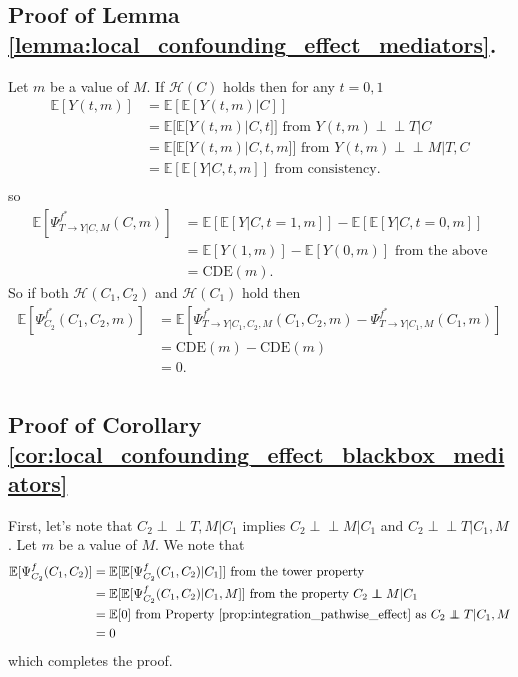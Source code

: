 \documentclass{article}
\theoremstyle{plain}
\theoremstyle{definition}
\theoremstyle{remark}
\newcommand{\effect}{\Psi}
\theoremstyle{mystyle}
\newcommand{\indep}{\perp\!\!\!\!\perp}
\begin{document}
\subsection{Proof of Lemma \ref{lemma:local_confounding_effect_mediators}.}
\label{proof:local_confounding_effect_mediators}
Let $m$ be a value of $M$. If $\mathcal{H}(C)$ holds then for any $t = 0, 1$
\begin{align*}
    \mathbb{E}[Y(t,m)]
    &= \mathbb{E}[\mathbb{E}[Y(t,m) | C]] \\
    &= \mathbb{E}[\mathbb{E}[Y(t,m) | C, t]] \text{ from } Y(t,m) \indep T | C \\
    &= \mathbb{E}[\mathbb{E}[Y(t,m) | C, t, m]] \text{ from } Y(t,m) \indep M | T, C \\
    &= \mathbb{E}[\mathbb{E}[Y | C, t, m]] \text{ from consistency.} \\
\end{align*}
so
\begin{align*}
    \mathbb{E}[\effect^{f^*}_{T \rightarrow Y | C, M}(C, m)]
    &= \mathbb{E}[\mathbb{E}[Y|C,t=1,m]] - \mathbb{E}[\mathbb{E}[Y|C,t=0,m]] \\
    &= \mathbb{E}[Y(1,m)] - \mathbb{E}[Y(0,m)] \text{ from the above} \\
    &= \text{CDE}(m).
\end{align*}
So if both $\mathcal{H}(C_1,C_2)$ and $\mathcal{H}(C_1)$ hold then
\begin{align*}
    \mathbb{E}[\effect^{f^*}_{C_2}(C_1,C_2,m)]
    &= \mathbb{E}[\effect^{f^*}_{T \rightarrow Y | C_1, C_2, M}(C_1, C_2, m) - \effect^{f^*}_{T \rightarrow Y | C_1, M}(C_1, m)] \\
    &= \text{CDE}(m) - \text{CDE}(m) \\
    &= 0. \\
 \end{align*}

\subsection{Proof of Corollary \ref{cor:local_confounding_effect_blackbox_mediators}}
\label{proof:local_confounding_effect_blackbox_mediators}
First, let's note that $C_2 \indep T, M | C_1$ implies $C_2 \indep M | C_1$ and $C_2 \indep T | C_1, M$. Let $m$ be a value of $M$. We note that
\begin{align*}
    \mathbb{E}[\effect^f_{C_2}(C_1,C_2)]
    &= \mathbb{E}[\mathbb{E}[\effect^f_{C_2}(C_1,C_2) | C_1]] \text{ from the tower property} \\
        &= \mathbb{E}[\mathbb{E}[\effect^f_{C_2}(C_1,C_2) | C_1, M]] \text{ from the property } C_2 \indep M | C_1 \\
    &= \mathbb{E}[0] \text{ from Property \ref{prop:integration_pathwise_effect} as } C_2 \indep T | C_1, M \\
    &= 0 \\
\end{align*}
which completes the proof.
\end{document}
